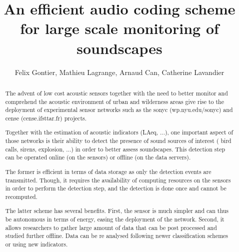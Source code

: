 \documentclass[final,3p,times,twocolumn]{elsarticle}
\begin{document}
\begin{frontmatter}



\title{An efficient audio coding scheme for large scale monitoring of soundscapes}


\author{Felix Gontier, Mathieu Lagrange, Arnaud Can, Catherine Lavandier}

\address{felix.gontier@reseau.eseo.fr\\mathieu.lagrange@cnrs.fr}

\begin{abstract}
The advent of low cost acoustic sensors together with the need to better monitor and comprehend the acoustic environment of urban and wilderness areas give rise to the deployment of experimental sensor networks such as the sonyc (wp.nyu.edu/sonyc) and cense (cense.ifsttar.fr) projects.

Together with the estimation of acoustic indicators (LAeq, ...), one important aspect of those networks is their ability to detect the presence of sound sources of interest ( bird calls, sirens, explosion, ...) in order to better assess soundscapes. This detection step can be operated online (on the sensors) or offline (on the data servers).

The former is efficient in terms of data storage as only the detection events are transmitted. Though, it requires the availability of computing resources on the sensors in order to perform the detection step, and the detection is done once and cannot be recomputed.

The latter scheme has several benefits. First, the sensor is much simpler and can thus be autonomous in terms of energy, easing the deployment of the network. Second, it allows researchers to gather large amount of data that can be post processed and studied further offline. Data can be re analysed following newer classification schemes or using new indicators.


\end{abstract}
\end{frontmatter}
\end{document}
